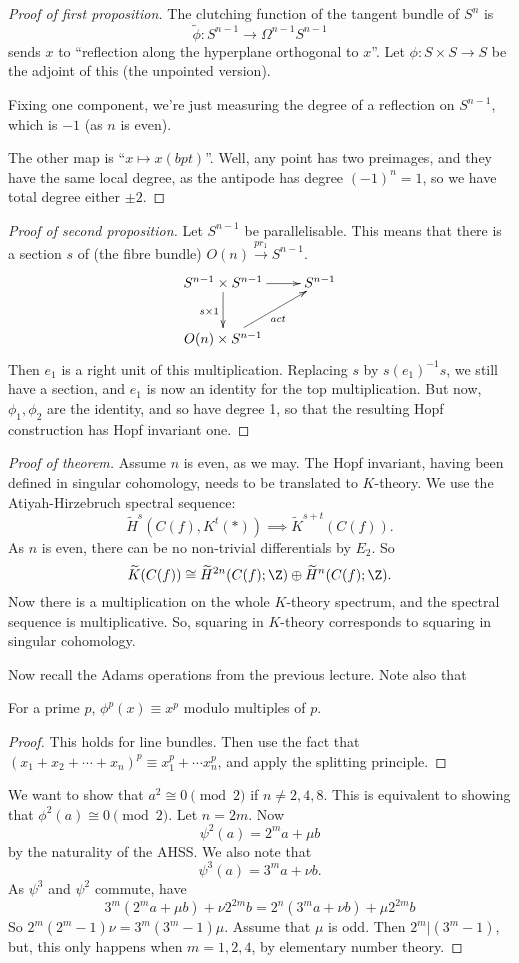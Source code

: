 \documentclass[11pt]{article}
\begin{document}
\begin{MarkusHopfInvOnePractice}
\begin{proof}[Proof of first proposition]
The clutching function of the tangent bundle of $S^n$ is
\[\widetilde\phi:S^{n-1}\to\Omega^{n-1}S^{n-1}\]
sends $x$ to ``reflection along the hyperplane orthogonal to $x$''. Let $\phi:S\times S\to S$ be the adjoint of this (the unpointed version).

Fixing one component, we're just measuring the degree of a reflection on $S^{n-1}$, which is $-1$ (as $n$ is even).

The other map is ``$x\mapsto x(bpt)$''. Well, any point has two preimages, and they have the same local degree, as the antipode has degree $(-1)^n=1$, so we have total degree either $\pm2$.
\end{proof}
\begin{proof}[Proof of second proposition]
Let $S^{n-1}$ be parallelisable. This means that there is a section $s$ of (the fibre bundle) $O(n)\overset{pr_1}{\to}S^{n-1}$.
\[\xymatrix{S^{n-1}\times S^{n-1}\ar[r]\ar[d]_{s\times 1}&S^{n-1}\\
O(n)\times S^{n-1}\ar[ur]_{act}&
}\]
Then $e_1$ is a right unit of this multiplication. Replacing $s$ by $s(e_1)^{-1}s$, we still have a section, and $e_1$ is now an identity for the top multiplication. But now, $\phi_1,\phi_2$ are the identity, and so have degree 1, so that the resulting Hopf construction has Hopf invariant one.
\end{proof}
\begin{proof}[Proof of theorem]
Assume $n$ is even, as we may.
The Hopf invariant, having been defined in singular cohomology, needs to be translated to $K$-theory. We use the Atiyah-Hirzebruch spectral sequence:
\[\widetilde H^s(C(f),K^t(\ast))\implies \widetilde K^{s+t}(C(f)).\]
As $n$ is even, there can be no non-trivial differentials by $E_2$. So 
\[\widetilde K(C(f))\cong\widetilde H^{2n}(C(f);\Z)\oplus \widetilde H^n(C(f);\Z).\]
Now there is a multiplication on the whole $K$-theory spectrum, and the spectral sequence is multiplicative. So, squaring in $K$-theory corresponds to squaring in singular cohomology.

Now recall the Adams operations from the previous lecture. Note also that
\begin{lem*}
For a prime $p$, $\phi^p(x)\equiv x^p$ modulo multiples of $p$.
\end{lem*}
\begin{proof}
This holds for line bundles. Then use the fact that $(x_1+x_2+\cdots+x_n)^p\equiv x_1^p+\cdots x_n^p$, and apply the splitting principle.
\end{proof}
We want to show that $a^2\cong 0\pmod{2}$ if $n\neq2,4,8$. This is equivalent to showing that $\phi^2(a)\cong 0\pmod{2}$. Let $n=2m$. Now
\[\psi^2(a)=2^ma+\mu b\]
by the naturality of the AHSS. We also note that
\[\psi^3(a)=3^ma+\nu b.\]
As $\psi^3$ and $\psi^2$ commute, have
\[3^m(2^ma+\mu b)+\nu 2^{2m}b=2^n(3^ma+\nu b)+\mu2^{2m}b\]
So $2^m(2^m-1)\nu= 3^m(3^{m}-1)\mu$.
Assume that $\mu$ is odd. Then $2^m|(3^{m}-1)$, but, this only happens when $m=1,2,4$, by elementary number theory.
\end{proof}


\pagebreak
\end{MarkusHopfInvOnePractice}
\end{document}
